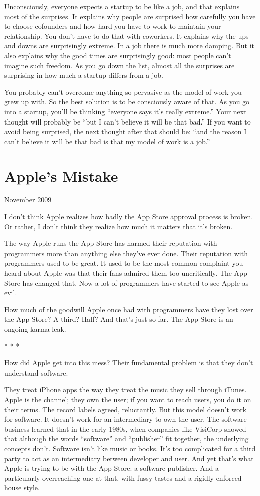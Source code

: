 \documentclass[12pt]{book}
\begin{document}
Unconsciously, everyone expects a startup to be like a job, and that
explains most of the surprises. It explains why people are surprised how
carefully you have to choose cofounders and how hard you have to work to
maintain your relationship. You don't have to do that with coworkers. It
explains why the ups and downs are surprisingly extreme. In a job there
is much more damping. But it also explains why the good times are
surprisingly good: most people can't imagine such freedom. As you go
down the list, almost all the surprises are surprising in how much a
startup differs from a job.

You probably can't overcome anything so pervasive as the model of work
you grew up with. So the best solution is to be consciously aware of
that. As you go into a startup, you'll be thinking ``everyone says it's
really extreme.'' Your next thought will probably be ``but I can't
believe it will be that bad.'' If you want to avoid being surprised, the
next thought after that should be: ``and the reason I can't believe it
will be that bad is that my model of work is a job.''
\chapter{Apple's Mistake}

November 2009

I don't think Apple realizes how badly the App Store approval process is
broken. Or rather, I don't think they realize how much it matters that
it's broken.

The way Apple runs the App Store has harmed their reputation with
programmers more than anything else they've ever done. Their reputation
with programmers used to be great. It used to be the most common
complaint you heard about Apple was that their fans admired them too
uncritically. The App Store has changed that. Now a lot of programmers
have started to see Apple as evil.

How much of the goodwill Apple once had with programmers have they lost
over the App Store? A third? Half? And that's just so far. The App Store
is an ongoing karma leak.

* * *

How did Apple get into this mess? Their fundamental problem is that they
don't understand software.

They treat iPhone apps the way they treat the music they sell through
iTunes. Apple is the channel; they own the user; if you want to reach
users, you do it on their terms. The record labels agreed, reluctantly.
But this model doesn't work for software. It doesn't work for an
intermediary to own the user. The software business learned that in the
early 1980s, when companies like VisiCorp showed that although the words
``software'' and ``publisher'' fit together, the underlying concepts
don't. Software isn't like music or books. It's too complicated for a
third party to act as an intermediary between developer and user. And
yet that's what Apple is trying to be with the App Store: a software
publisher. And a particularly overreaching one at that, with fussy
tastes and a rigidly enforced house style.
\end{document}
